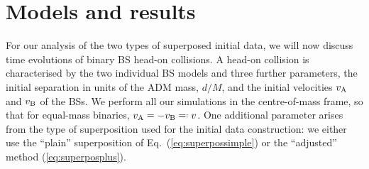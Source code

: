 \documentclass[]{iopart}
\newcommand{\us}[1]{\textcolor{teal}{[{\it\textbf{US: #1}}]} }
\renewcommand{\mr}[1]{\textcolor{purple}{[{\it\textbf{MR: #1}}]} }
\newcommand{\el}[1]{\textcolor{brown}{[{\it\textbf{EL: #1}}]} }
\newcommand*{\invdefeq}{=\mathrel{\vcenter{\baselineskip0.5ex \lineskiplimit0pt
                     \hbox{\scriptsize.}\hbox{\scriptsize.}}}%
                     }
\begin{document}

\section{Models and results}
\label{sec:results}
%
For our analysis of the two types of superposed initial data,
we will now discuss time evolutions of binary BS head-on collisions.
A head-on collision is characterised
by the two individual BS models and three further parameters,
the initial separation in units of the ADM mass,
$d/M$,
and the initial velocities $v_{\rm A}$ and
$v_{\rm B}$ of the BSs. We perform all our simulations in the centre-of-mass
frame, so that for equal-mass binaries, $v_{\rm A}=-v_{\rm B}\invdefeq v$.
One additional parameter arises from the type of superposition
used for the initial data construction: we either use the
``plain'' superposition of Eq.~(\ref{eq:superpossimple}) or
the ``adjusted'' method (\ref{eq:superposplus}).
\end{document}
